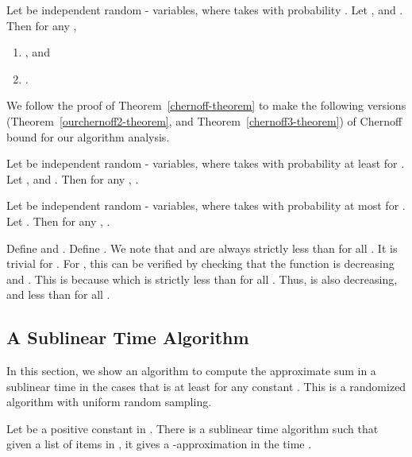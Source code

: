 \documentclass[runningheads]{llncs}
\begin{document}
\begin{theorem}\label{chernoff-theorem}
Let  be  independent random - variables,
where  takes  with probability . Let , and . Then for any ,
\begin{enumerate}
\item , and
\item
.
\end{enumerate}
\end{theorem}




We follow the proof of Theorem~\ref{chernoff-theorem} to make the
following versions (Theorem~\ref{ourchernoff2-theorem}, and
Theorem~\ref{chernoff3-theorem}) of Chernoff bound for our algorithm
analysis.



\begin{theorem}\label{chernoff3-theorem}
Let  be  independent random - variables,
where  takes  with probability at least  for . Let , and . Then for any
,
 .
\end{theorem}

\begin{theorem}\label{ourchernoff2-theorem}
Let  be  independent random - variables,
where  takes  with probability at most  for . Let . Then for any ,
.
\end{theorem}

Define  and
. Define
. We note that
 and  are always strictly less than 
for all . It is trivial for . For
, this can be verified by checking that the  function
 is decreasing and . This is because
 which is strictly less than  for all .
Thus,  is also decreasing, and less than  for all
.



\subsection{A Sublinear Time Algorithm}

In this section, we show an algorithm to compute the approximate sum
in a sublinear time in the cases that  is at least
 for any constant . This is a
randomized algorithm with uniform random sampling.

\begin{theorem}\label{main-thm}
Let  be a positive constant in . There is a
sublinear time algorithm such that given  a list of items
 in , it gives a
-approximation in the time .
\end{theorem}
\end{document}
